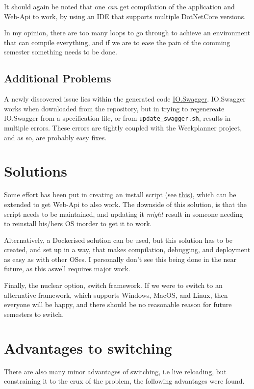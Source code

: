 It should again be noted that one \emph{can} get compilation of the
application and Web-Api to work, by using an IDE that supports multiple
DotNetCore versions.

In my opinion, there are too many loops to go through to achieve an
environment that can compile everything, and if we are to ease the pain
of the comming semester something needs to be done.

\subsection{Additional Problems}

A newly discovered issue lies within the generated code
\href{https://github.com/aau-giraf/weekplanner/tree/master/IO.Swagger}{IO.Swagger}.
IO.Swagger works when downloaded from the repository, but in trying to
regenereate IO.Swagger from a specification file, or from
\texttt{update\_swagger.sh}, results in multiple errors. These errors
are tightly coupled with the Weekplanner project, and as so, are
probably easy fixes.

\section{Solutions}

Some effort has been put in creating an install script (see
\href{https://hackmd.io/_gtHEeO6Q36ww-oANJrJaw}{this}), which can be
extended to get Web-Api to also work. The downside of this solution, is
that the script needs to be maintained, and updating it \emph{might}
result in someone needing to reinstall his/hers OS inorder to get it to
work.

Alternatively, a Dockerised solution can be used, but this solution has
to be created, and set up in a way, that makes compilation, debugging,
and deployment as easy as with other OSes. I personally don't see this
being done in the near future, as this aswell requires major work.

Finally, the nuclear option, switch framework. If we were to switch to
an alternative framework, which supports Windows, MacOS, and Linux, then
everyone will be happy, and there should be no reasonable reason for
future semesters to switch.

\section{Advantages to switching}

There are also many minor advantages of switching, i.e live reloading,
but constraining it to the crux of the problem, the following advantages
were found.


